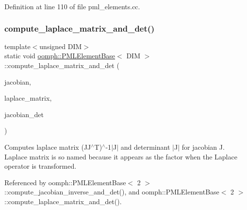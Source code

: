 Definition at line 110 of file pml\+\_\+elements.\+cc.

\mbox{\label{classoomph_1_1PMLElementBase_a172a01ea5c2887c9555697a1b1878582}} 
\subsubsection{\texorpdfstring{compute\+\_\+laplace\+\_\+matrix\+\_\+and\+\_\+det()}{compute\_laplace\_matrix\_and\_det()}\hspace{0.1cm}{\footnotesize\ttfamily [5/12]}}
{\footnotesize\ttfamily template$<$unsigned D\+IM$>$ \\
static void \hyperlink{classoomph_1_1PMLElementBase}{oomph\+::\+P\+M\+L\+Element\+Base}$<$ D\+IM $>$\+::compute\+\_\+laplace\+\_\+matrix\+\_\+and\+\_\+det (\begin{DoxyParamCaption}\item[{const \hyperlink{classoomph_1_1DenseComplexMatrix}{Dense\+Complex\+Matrix} \&}]{jacobian,  }\item[{\hyperlink{classoomph_1_1DenseComplexMatrix}{Dense\+Complex\+Matrix} \&}]{laplace\+\_\+matrix,  }\item[{std\+::complex$<$ double $>$ \&}]{jacobian\+\_\+det }\end{DoxyParamCaption})\hspace{0.3cm}{\ttfamily [static]}}



Computes laplace matrix (J\+J$^\wedge$T)$^\wedge$-\/1$\vert$\+J$\vert$ and determinant $\vert$\+J$\vert$ for jacobian J. Laplace matrix is so named because it appears as the factor when the Laplace operator is transformed. 



Referenced by oomph\+::\+P\+M\+L\+Element\+Base$<$ 2 $>$\+::compute\+\_\+jacobian\+\_\+inverse\+\_\+and\+\_\+det(), and oomph\+::\+P\+M\+L\+Element\+Base$<$ 2 $>$\+::compute\+\_\+laplace\+\_\+matrix\+\_\+and\+\_\+det().

\mbox{\label{classoomph_1_1PMLElementBase_af0b8dec31cb5d4acc0ca7628f895b583}} 
